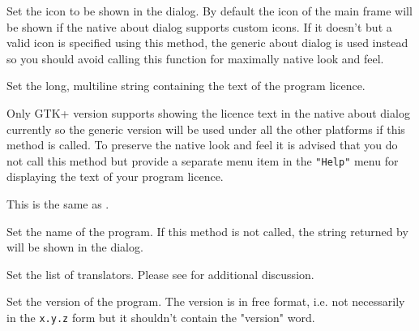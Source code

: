 
Set the icon to be shown in the dialog. By default the icon of the main frame
will be shown if the native about dialog supports custom icons. If it doesn't
but a valid icon is specified using this method, the generic about dialog is
used instead so you should avoid calling this function for maximally native
look and feel.


\label{wxaboutdialoginfosetlicence}


Set the long, multiline string containing the text of the program licence.

Only GTK+ version supports showing the licence text in the native about dialog
currently so the generic version will be used under all the other platforms if
this method is called. To preserve the native look and feel it is advised that
you do not call this method but provide a separate menu item in the 
\texttt{"Help"} menu for displaying the text of your program licence.


\label{wxaboutdialoginfosetlicense}


This is the same as .


\label{wxaboutdialoginfosetname}


Set the name of the program. If this method is not called, the string returned
by  will be shown in the dialog.


\label{wxaboutdialoginfosettranslators}


Set the list of translators. Please see 
 for additional
discussion.


\label{wxaboutdialoginfosetversion}


Set the version of the program. The version is in free format, i.e. not
necessarily in the \texttt{x.y.z} form but it shouldn't contain the "version"
word.


